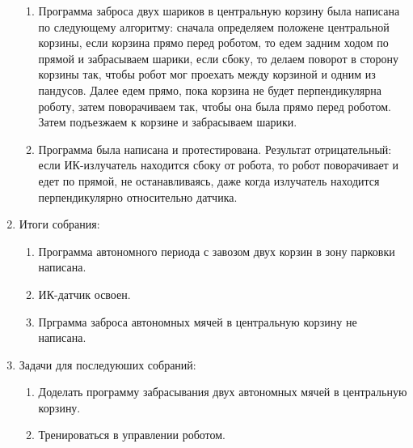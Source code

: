 \begin{enumerate}
\begin{enumerate}
		\item Программа заброса двух шариков в центральную корзину была написана по следующему алгоритму: сначала определяем положене центральной корзины, если корзина прямо перед роботом, то едем задним ходом по прямой и забрасываем шарики, если сбоку, то делаем поворот в сторону корзины так, чтобы робот мог проехать между корзиной и одним из пандусов. Далее едем прямо, пока корзина не будет перпендикулярна роботу, затем поворачиваем так, чтобы она была прямо перед роботом. Затем подъезжаем к корзине и забрасываем шарики.
		
		\item Программа была написана и протестирована. Результат отрицательный: если ИК-излучатель находится сбоку от робота, то робот поворачивает и едет по прямой, не останавливаясь, даже когда излучатель находится перпендикулярно относительно датчика.   
	\end{enumerate}
	\item Итоги собрания:
	\begin{enumerate}
		\item Программа автономного периода с завозом двух корзин в зону парковки написана.
		
		\item ИК-датчик освоен.
		
		\item Прграмма заброса автономных мячей в центральную корзину не написана.
	\end{enumerate}
	\item Задачи для последуюших собраний:
	\begin{enumerate}
		\item Доделать программу забрасывания двух автономных мячей в центральную корзину.
		
		\item Тренироваться в управлении роботом.
	\end{enumerate}
\end{enumerate}
\fillpage